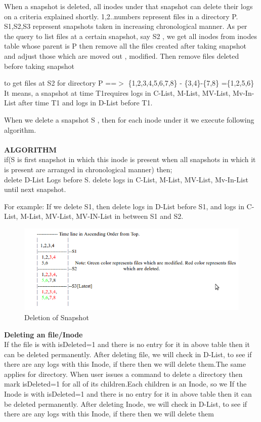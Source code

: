 When a snapshot is deleted, all inodes under that snapshot can delete their logs on a criteria explained shortly. 1,2..numbers represent files in a directory P. S1,S2,S3 represent snapshots taken in increasing chronological manner. As per the query to list files at a certain snapshot, say S2 , we get all inodes from inodes table whose parent is P then remove all the files created after taking snapshot and adjust those which are moved out , modified. Then remove files deleted before taking snapshot 

to get files at S2 for directory P ==$>$ \{1,2,3,4,5,6,7,8\} - \{3,4\}-\{7,8\} =\{1,2,5,6\}
It means, a snapshot at time T1requires logs in C-List, M-List, MV-List, Mv-In-List after time T1 and logs in D-List before T1.

When we delete a snapshot S , then for each inode under it we execute following algorithm.\\\\
\textbf{ALGORITHM}\\
if(S is first snapshot in which this inode is present when all snapshots in which it is present are arranged in chronological manner) then;\\
\hspace{5em}delete D-List Logs before S. delete logs in C-List, M-List, MV-List, Mv-In-List until next snapshot.

For example: If we delete S1, then delete logs in D-List before S1, and logs in C-List, M-List, MV-List, MV-IN-List in between S1 and S2.\\

\begin{figure}[h!]
\centering  
 \includegraphics[scale=0.8]{figs/preliminar/Approach2.png}
  \caption{Deletion of Snapshot}
  \label{fig:approach2}
\end{figure}


\textbf{Deleting an file/Inode}\\
If the file is with isDeleted=1 and there is no entry for it in above table then it can be deleted permanently. After deleting file, we will check in D-List, to see if there are any logs with this Inode, if there then we will delete them.The same applies for directory. When user issues a command to delete a directory then mark isDeleted=1 for all of its children.Each children is an Inode, so we If the Inode is with isDeleted=1 and there is no entry for it in above table then it can be deleted permanently. After deleting Inode, we will check in D-List, to see if there are any logs with this Inode, if there then we will delete them

